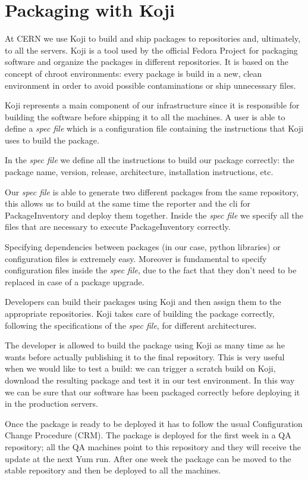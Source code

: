 \section{Packaging with Koji}

At CERN we use Koji to build and ship packages to repositories and,
ultimately, to all the servers. Koji is a tool used by the official Fedora
Project \cite{FedoraProject} for packaging software and organize the
packages in different repositories. It is based on the concept of chroot
environments: every package is build in a new, clean environment in order
to avoid possible contaminations or ship unnecessary files.

Koji represents a main component of our infrastructure since it is
responsible for building the software before shipping it to all the
machines. A user is able to define a \textit{spec file} which is
a configuration file containing the instructions that Koji uses to build
the package.

In the \textit{spec file} we define all the instructions to build our
package correctly: the package name, version, release, architecture,
installation instructions, etc.

Our \textit{spec file} is able to generate two different packages from the
same repository, this allows us to build at the same time the reporter and
the cli for PackageInventory and deploy them together. Inside the
\textit{spec file} we specify all the files that are necessary to execute
PackageInventory correctly.

Specifying dependencies between packages (in our case, python libraries)
or configuration files is extremely easy. Moreover is fundamental to
specify configuration files inside the \textit{spec file}, due to the fact
that they don't need to be replaced in case of a package upgrade.

Developers can build their packages using Koji and then assign them to the
appropriate repositories. Koji takes care of building the package
correctly, following the specifications of the \textit{spec file}, for
different architectures.

The developer is allowed to build the package using Koji as many time as
he wants before actually publishing it to the final repository. This is
very useful when we would like to test a build: we can trigger a scratch
build on Koji, download the resulting package and test it in our test
environment. In this way we can be sure that our software has been
packaged correctly before deploying it in the production servers.

Once the package is ready to be deployed it has to follow the usual
Configuration Change Procedure (CRM). The package is deployed for the
first week in a QA repository; all the QA machines point to this
repository and they will receive the update at the next Yum run. After one
week the package can be moved to the stable repository and then be
deployed to all the machines.

